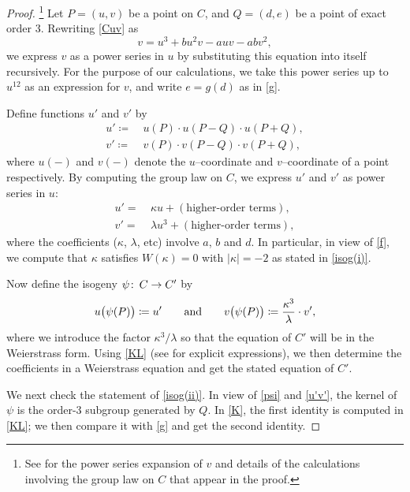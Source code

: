 \documentclass[microtype]{gtpart}     %
\theoremstyle{remark}
\theoremstyle{definition}
\def\co{\colon\thinspace}
\newcommand{\ad}{{\rm and}}
\newcommand{\ce}{\coloneqq}
\newcommand{\K}{\kappa}
\begin{document}
\begin{proof}
 \footnote{See  for the power series expansion of $v$ and 
 details of the calculations involving the group law on $C$ that appear in 
 the proof.  }
 Let $P = (u,v)$ be a point on $C$, and $Q = (d,e)$ be a point of exact order 
 3.  Rewriting \eqref{Cuv} as 
 \[
  v = u^3 + b u^2 v - a u v - a b v^2, 
 \]
 we express $v$ as a power series in $u$ by substituting this equation into 
 itself recursively.  For the purpose of our calculations, we take this power 
 series up to $u^{12}$ as an expression for $v$, and write $e = g(d)$ as in 
 \eqref{g}.  

 Define functions $u'$ and $v'$ by 
 \begin{equation}
 \label{u'v'}
 \begin{split}
  u' \ce & ~ u(P) \cdot u(P-Q) \cdot u(P+Q), \\
  v' \ce & ~ v(P) \cdot v(P-Q) \cdot v(P+Q), 
 \end{split}
 \end{equation}
 where $u(-)$ and $v(-)$ denote the $u$--coordinate and $v$--coordinate of a 
 point respectively.  By computing the group law on $C$, we express $u'$ and 
 $v'$ as power series in $u$: 
 \begin{equation}
 \label{KL}
 \begin{split}
  u' = & ~ \K u + (\text{higher-order terms}), \\
  v' = & ~ \lambda u^3 + (\text{higher-order terms}), 
 \end{split}
 \end{equation}
 where the coefficients ($\K$, $\lambda$, etc) involve $a$, $b$ and $d$.  In 
 particular, in view of \eqref{f}, we compute that $\K$ satisfies $W(\K) = 0$ 
 with $|\K| = -2$ as stated in \eqref{isog(i)}.  

 Now define the isogeny $\psi \co C \to C'$ by 
 \begin{equation}
 \label{psi}
  u\big( \psi(P) \big) \ce u' \qquad \ad \qquad v\big( \psi(P) \big) \ce \frac{\K^3}{\lambda} \cdot v', 
 \end{equation}
 where we introduce the factor $\K^3 / \lambda$ so that the equation of $C'$ 
 will be in the Weierstrass form.  Using \eqref{KL} (see  
 for explicit expressions), we then determine the coefficients in a 
 Weierstrass equation and get the stated equation of $C'$.  

 We next check the statement of \eqref{isog(ii)}.  In view of \eqref{psi} and 
 \eqref{u'v'}, the kernel of $\psi$ is the order-3 subgroup generated by $Q$.  
 In \eqref{K}, the first identity is computed in \eqref{KL}; we then compare 
 it with \eqref{g} and get the second identity.  


\end{proof}
\end{document}
